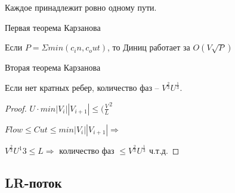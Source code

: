 Каждое принадлежит ровно одному пути.

\begin{theorem}{Первая теорема Карзанова}

Если $P = \Sigma  min(c_in, c_out)$, то Диниц работает за $O(V \sqrt{P})$
\end{theorem}

\begin{theorem}{Вторая теорема Карзанова}

Если нет кратных ребер, количество фаз -- $V^\frac{2}{3} U^\frac{1}{3}$.
\end{theorem}
\begin{proof}
$U \cdot min|V_i||V_{i + 1}| \leq (\frac{V}{L}^2$

$Flow \leq Cut \leq  min|V_i||V_{i + 1}| \Rightarrow $

 $V^\frac{2}{3}U^{1}{3}\leq L \Rightarrow$
 количество фаз $\leq V^\frac{2}{3} U^\frac{1}{3}$ ч.т.д.
\end{proof}

\subsection{LR-поток}

